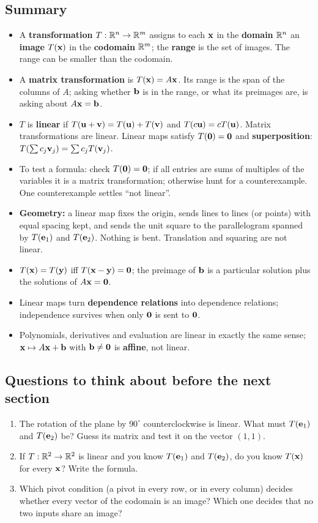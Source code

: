 \documentclass[11pt]{article}
\begin{document}
\subsection*{Summary}
\begin{itemize}
  \item A \textbf{transformation} $T:\mathbb{R}^n\to\mathbb{R}^m$ assigns to each $\mathbf{x}$ in the \textbf{domain} $\mathbb{R}^n$ an \textbf{image} $T(\mathbf{x})$ in the \textbf{codomain} $\mathbb{R}^m$; the \textbf{range} is the set of images. The range can be smaller than the codomain.
  \item A \textbf{matrix transformation} is $T(\mathbf{x})=A\mathbf{x}$. Its range is the span of the columns of $A$; asking whether $\mathbf{b}$ is in the range, or what its preimages are, is asking about $A\mathbf{x}=\mathbf{b}$.
  \item $T$ is \textbf{linear} if $T(\mathbf{u}+\mathbf{v})=T(\mathbf{u})+T(\mathbf{v})$ and $T(c\mathbf{u})=cT(\mathbf{u})$. Matrix transformations are linear. Linear maps satisfy $T(\mathbf{0})=\mathbf{0}$ and \textbf{superposition}: $T(\sum c_j\mathbf{v}_j)=\sum c_jT(\mathbf{v}_j)$.
  \item To test a formula: check $T(\mathbf{0})=\mathbf{0}$; if all entries are sums of multiples of the variables it is a matrix transformation; otherwise hunt for a counterexample. One counterexample settles ``not linear''.
  \item \textbf{Geometry:} a linear map fixes the origin, sends lines to lines (or points) with equal spacing kept, and sends the unit square to the parallelogram spanned by $T(\mathbf{e}_1)$ and $T(\mathbf{e}_2)$. Nothing is bent. Translation and squaring are not linear.
  \item $T(\mathbf{x})=T(\mathbf{y})$ iff $T(\mathbf{x}-\mathbf{y})=\mathbf{0}$; the preimage of $\mathbf{b}$ is a particular solution plus the solutions of $A\mathbf{x}=\mathbf{0}$.
  \item Linear maps turn \textbf{dependence relations} into dependence relations; independence survives when only $\mathbf{0}$ is sent to $\mathbf{0}$.
  \item Polynomials, derivatives and evaluation are linear in exactly the same sense; $\mathbf{x}\mapsto A\mathbf{x}+\mathbf{b}$ with $\mathbf{b}\neq\mathbf{0}$ is \textbf{affine}, not linear.
\end{itemize}

\subsection*{Questions to think about before the next section}
\begin{enumerate}
  \item The rotation of the plane by $90^\circ$ counterclockwise is linear. What must $T(\mathbf{e}_1)$ and $T(\mathbf{e}_2)$ be? Guess its matrix and test it on the vector $(1,1)$.
  \item If $T:\mathbb{R}^2\to\mathbb{R}^2$ is linear and you know $T(\mathbf{e}_1)$ and $T(\mathbf{e}_2)$, do you know $T(\mathbf{x})$ for every $\mathbf{x}$? Write the formula.
  \item Which pivot condition (a pivot in every row, or in every column) decides whether every vector of the codomain is an image? Which one decides that no two inputs share an image?
\end{enumerate}
\end{document}
